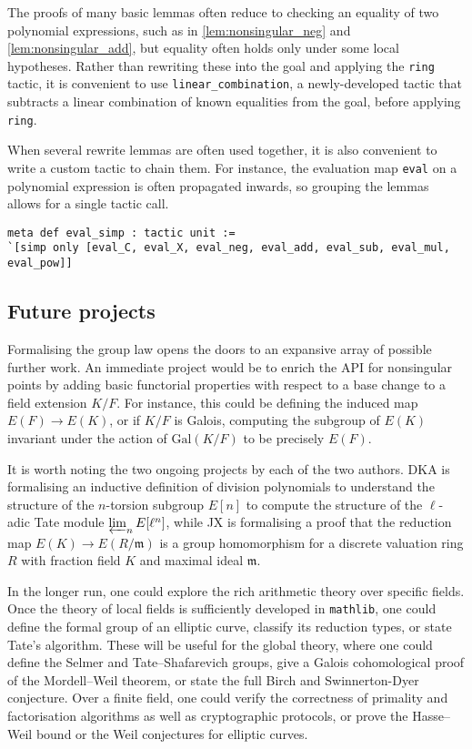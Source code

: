 \documentclass[a4paper,UKenglish,cleveref,autoref,thm-restate]{lipics-v2021}
\begin{document}
The proofs of many basic lemmas often reduce to checking an equality of two polynomial expressions, such as in \cref{lem:nonsingular_neg} and \cref{lem:nonsingular_add}, but equality often holds only under some local hypotheses. Rather than rewriting these into the goal and applying the \texttt{ring} tactic, it is convenient to use \texttt{linear\_combination}, a newly-developed tactic that subtracts a linear combination of known equalities from the goal, before applying \texttt{ring}.

When several rewrite lemmas are often used together, it is also convenient to write a custom tactic to chain them. For instance, the evaluation map \texttt{eval} on a polynomial expression is often propagated inwards, so grouping the lemmas allows for a single tactic call.
\begin{lstlisting}
meta def eval_simp : tactic unit :=
`[simp only [eval_C, eval_X, eval_neg, eval_add, eval_sub, eval_mul, eval_pow]]
\end{lstlisting}

\subsection{Future projects}

Formalising the group law opens the doors to an expansive array of possible further work. An immediate project would be to enrich the API for nonsingular points by adding basic functorial properties with respect to a base change to a field extension $ K / F $. For instance, this could be defining the induced map $ E(F) \to E(K) $, or if $ K / F $ is Galois, computing the subgroup of $ E(K) $ invariant under the action of $ \mathrm{Gal}(K / F) $ to be precisely $ E(F) $.

It is worth noting the two ongoing projects by each of the two authors. DKA is formalising an inductive definition of division polynomials to understand the structure of the $ n $-torsion subgroup $ E[n] $ to compute the structure of the $ \ell $-adic Tate module $ \varprojlim_n E[\ell^n] $, while JX is formalising a proof that the reduction map $ E(K) \to E(R / \mathfrak{m}) $ is a group homomorphism for a discrete valuation ring $ R $ with fraction field $ K $ and maximal ideal $ \mathfrak{m} $.

In the longer run, one could explore the rich arithmetic theory over specific fields. Once the theory of local fields is sufficiently developed in \texttt{mathlib}, one could define the formal group of an elliptic curve, classify its reduction types, or state Tate's algorithm. These will be useful for the global theory, where one could define the Selmer and Tate--Shafarevich groups, give a Galois cohomological proof of the Mordell--Weil theorem, or state the full Birch and Swinnerton-Dyer conjecture. Over a finite field, one could verify the correctness of primality and factorisation algorithms as well as cryptographic protocols, or prove the Hasse--Weil bound or the Weil conjectures for elliptic curves.
\end{document}
